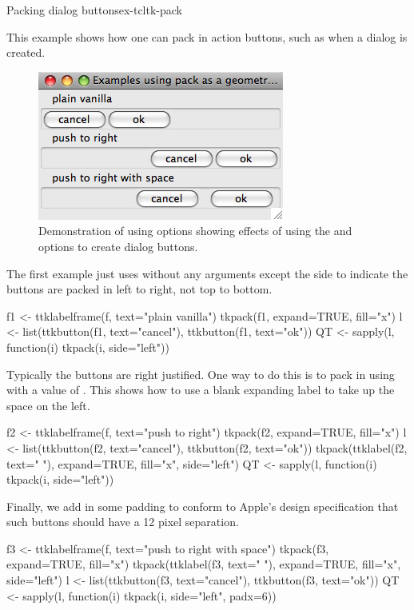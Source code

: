 \begin{example}{Packing dialog buttons}{ex-tcltk-pack}


This example shows how one can pack in action buttons, such as when a
dialog is created.

\begin{figure}
  \centering
  \includegraphics[width=.5\textwidth]{fig-tcltk-pack-buttons.png}
  \caption{Demonstration of using  options showing
    effects of using the 
    and  options to create
    dialog buttons.}
  \label{fig:tcltk-pack-buttons}
\end{figure}


The first example just uses  without any arguments except
the side to indicate the buttons are packed in left to right, not top
to bottom.
\begin{Schunk}
\begin{Sinput}
 f1 <- ttklabelframe(f, text="plain vanilla")
 tkpack(f1, expand=TRUE, fill="x")
 l <- list(ttkbutton(f1, text="cancel"), ttkbutton(f1, text="ok"))
 QT <- sapply(l, function(i) tkpack(i, side="left"))
\end{Sinput}
\end{Schunk}

Typically the buttons are right justified. One way to do this is to
pack in using  with a value of . This shows
how to use a blank expanding label to take up the space on the left.
\begin{Schunk}
\begin{Sinput}
 f2 <- ttklabelframe(f, text="push to right")
 tkpack(f2, expand=TRUE, fill="x")
 l <- list(ttkbutton(f2, text="cancel"), ttkbutton(f2, text="ok"))
 tkpack(ttklabel(f2, text=" "), expand=TRUE, fill="x", side="left")
 QT <- sapply(l, function(i) tkpack(i, side="left"))
\end{Sinput}
\end{Schunk}

Finally, we add in some padding to conform to Apple's design specification that such
buttons should have a 12 pixel separation.
\begin{Schunk}
\begin{Sinput}
 f3 <- ttklabelframe(f, text="push to right with space")
 tkpack(f3, expand=TRUE, fill="x")
 tkpack(ttklabel(f3, text=" "), expand=TRUE, fill="x", side="left")
 l <- list(ttkbutton(f3, text="cancel"), ttkbutton(f3, text="ok"))
 QT <- sapply(l, function(i) tkpack(i, side="left", padx=6))
\end{Sinput}
\end{Schunk}
\end{example}

